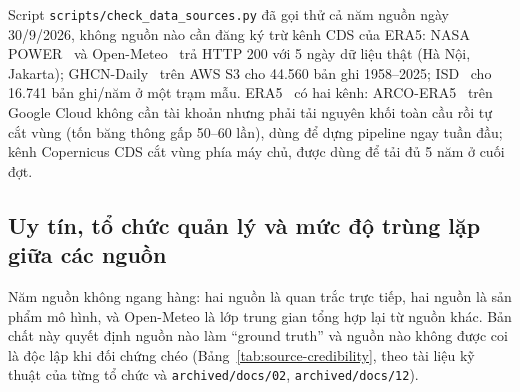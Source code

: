 \documentclass[12pt,a4paper]{report}
\begin{document}
Script \texttt{scripts/check\_data\_sources.py} đã gọi thử cả năm nguồn ngày 30/9/2026, không nguồn
nào cần đăng ký trừ kênh CDS của ERA5: NASA POWER~\cite{nasapower} và Open-Meteo~\cite{openmeteo} trả
HTTP 200 với 5 ngày dữ liệu thật (Hà Nội, Jakarta); GHCN-Daily~\cite{menne2012ghcnd} trên AWS S3 cho
44.560 bản ghi 1958--2025; ISD~\cite{smith2011isd} cho 16.741 bản ghi/năm ở một trạm mẫu. ERA5~\cite{hersbach2020era5}
có hai kênh: ARCO-ERA5~\cite{arcoera5} trên Google Cloud không cần tài khoản nhưng phải tải nguyên khối
toàn cầu rồi tự cắt vùng (tốn băng thông gấp 50--60 lần), dùng để dựng pipeline ngay tuần đầu; kênh
Copernicus CDS cắt vùng phía máy chủ, được dùng để tải đủ 5 năm ở cuối đợt.

\subsection{Uy tín, tổ chức quản lý và mức độ trùng lặp giữa các nguồn}
\label{sec:source-credibility}

Năm nguồn không ngang hàng: hai nguồn là quan trắc trực tiếp, hai nguồn là sản phẩm mô hình, và
Open-Meteo là lớp trung gian tổng hợp lại từ nguồn khác. Bản chất này quyết định nguồn nào làm
``ground truth'' và nguồn nào không được coi là độc lập khi đối chứng chéo
(Bảng~\ref{tab:source-credibility}, theo tài liệu kỹ thuật của từng tổ chức và \texttt{archived/docs/02},
\texttt{archived/docs/12}).
\end{document}

